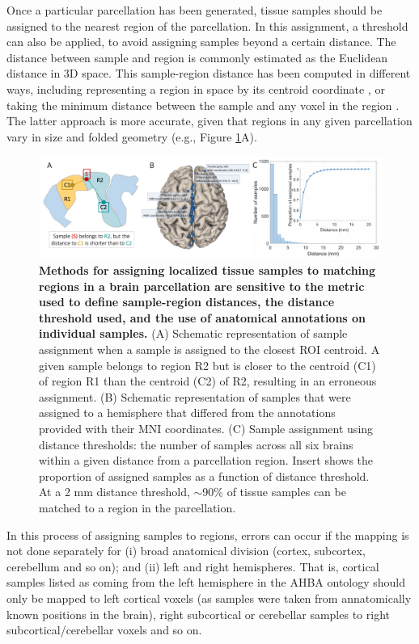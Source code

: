 Once a particular parcellation has been generated, tissue samples should be assigned to the nearest region of the parcellation. In this assignment, a threshold can also be applied, to avoid assigning samples beyond a certain distance. The distance between sample and region is commonly estimated as the Euclidean distance in 3D space. This sample-region distance has been computed in different ways, including representing a region in space by its centroid coordinate \citep{Vertes2016b,Whitaker2016a,McColgan2018}, or taking the minimum distance between the sample and any voxel in the region \citep{French2015,Parkes2017,Romme2017}. The latter approach is more accurate, given that regions in any given parcellation vary in size and folded geometry (e.g., Figure \ref{fig:Ch4Fig5}A).

\begin{figure}[h!]
  \centering
    \includegraphics[width=1\textwidth]{Chapter4/Ch4Fig5.pdf}
\caption{\textbf{Methods for assigning localized tissue samples to matching regions in a brain parcellation are sensitive to the metric used to define sample-region distances, the distance threshold used, and the use of anatomical annotations on individual samples.}
(A) Schematic representation of sample assignment when a sample is assigned to the closest ROI centroid. A given sample belongs to region R2 but is closer to the centroid (C1) of region R1 than the centroid (C2) of R2, resulting in an erroneous assignment.
(B) Schematic representation of samples that were assigned to a hemisphere that differed from the annotations provided with their MNI coordinates.
(C) Sample assignment using distance thresholds: the number of samples across all six brains within a given distance from a parcellation region. Insert shows the proportion of assigned samples as a function of distance threshold. At a 2 mm distance threshold, $\sim$90\%  of tissue samples can be matched to a region in the parcellation. }
\label{fig:Ch4Fig5}
\end{figure}

In this process of assigning samples to regions, errors can occur if the mapping is not done separately for (i) broad anatomical division (cortex, subcortex, cerebellum and so on); and (ii) left and right hemispheres. That is, cortical samples listed as coming from the left hemisphere in the AHBA ontology should only be mapped to left cortical voxels (as samples were taken from annatomically known positions in the brain), right subcortical or cerebellar samples to right subcortical/cerebellar voxels and so on.

